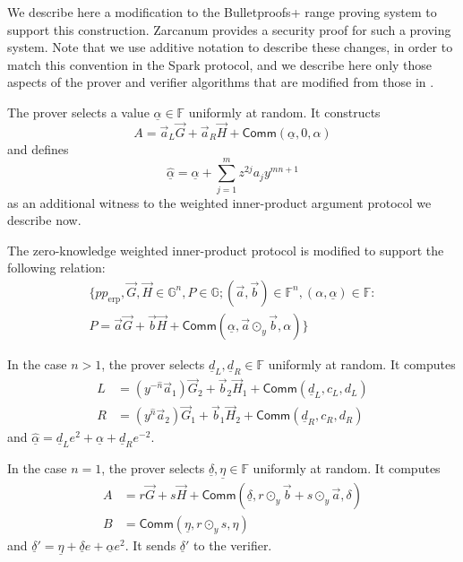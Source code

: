 \documentclass{article}
\newcommand{\G}{\mathbb{G}}
\newcommand{\F}{\mathbb{F}}
\newcommand{\func}[1]{\mathsf{#1}}
\newcommand{\comm}{\func{Comm}}
\begin{document}
We describe here a modification to the Bulletproofs+ range proving system to support this construction.
Zarcanum \cite{zarcanum} provides a security proof for such a proving system.
Note that we use additive notation to describe these changes, in order to match this convention in the Spark protocol, and we describe here only those aspects of the prover and verifier algorithms that are modified from those in \cite{bp_plus}.

The prover selects a value $\underline{\alpha} \in \F$ uniformly at random.
It constructs $$A = \vec{a}_L \vec{G} + \vec{a}_R \vec{H} + \comm(\underline{\alpha}, 0, \alpha)$$ and defines $$\widehat{\underline{\alpha}} = \underline{\alpha} + \sum_{j=1}^m z^{2j}a_j y^{mn+1}$$ as an additional witness to the weighted inner-product argument protocol we describe now.

The zero-knowledge weighted inner-product protocol is modified to support the following relation:
\begin{multline*}
\{ pp_{\text{erp}}, \vec{G}, \vec{H} \in \G^n, P \in \G; (\vec{a}, \vec{b}) \in \F^n, (\alpha, \underline{\alpha}) \in \F : \\
P = \vec{a}\vec{G} + \vec{b}\vec{H} + \comm(\underline{\alpha}, \vec{a} \odot_y \vec{b}, \alpha) \}
\end{multline*}

In the case $n > 1$, the prover selects $\underline{d}_L, \underline{d}_R \in \F$ uniformly at random.
It computes
\begin{align*}
    L &= (y^{-\widehat{n}}\vec{a}_1)\vec{G}_2 + \vec{b}_2 \vec{H}_1 + \comm(\underline{d}_L, c_L, d_L) \\
    R &= (y^{\widehat{n}}\vec{a}_2)\vec{G}_1 + \vec{b}_1 \vec{H}_2 + \comm(\underline{d}_R, c_R, d_R)
\end{align*}
and $\widehat{\underline{\alpha}} = \underline{d}_L e^2 + \underline{\alpha} + \underline{d}_R e^{-2}$.

In the case $n = 1$, the prover selects $\underline{\delta}, \underline{\eta} \in \F$ uniformly at random.
It computes
\begin{align*}
    A &= r\vec{G} + s\vec{H} + \comm(\underline{\delta}, r \odot_y \vec{b} + s \odot_y \vec{a}, \delta) \\
    B &= \comm(\underline{\eta}, r \odot_y s, \eta)
\end{align*}
and $\underline{\delta}' = \underline{\eta} + \underline{\delta} e + \underline{\alpha} e^2$.
It sends $\underline{\delta}'$ to the verifier.
\end{document}
